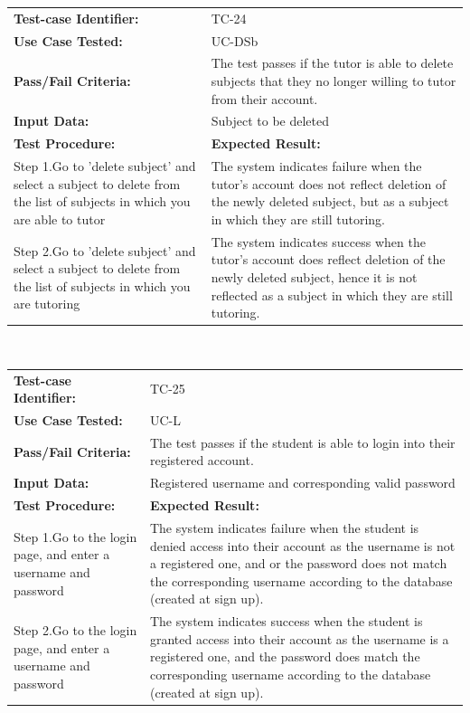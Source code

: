 \documentclass[12pt]{article}
\begin{document}
{\begin{tabular}{| p{8cm} | p{8cm} |} \hline
	\textbf{Test-case Identifier:}& TC-24\\
	\textbf{Use Case Tested:}& UC-DSb\\
	\textbf{Pass/Fail Criteria:}& The test passes if the tutor is able to delete subjects that they no longer willing to tutor from  their account.\\
	\textbf{Input Data:}& Subject to be deleted\\\hline
	\textbf{Test Procedure:}& \textbf{Expected Result:} \\\hline
	Step 1.Go to 'delete subject' and select a subject to delete from the list of subjects in which you are able to tutor & The system indicates failure when the tutor's account does not reflect deletion of the newly deleted subject, but as a subject in which they are still tutoring. \\
	Step 2.Go to 'delete subject' and select a subject to delete from the list of subjects in which you are tutoring & The system indicates success when the tutor's account does  reflect deletion of the newly deleted subject, hence it is not reflected  as a subject in which they are still tutoring.\\
		\hline
\end{tabular}
\\

\begin{tabular}{| p{8cm} | p{8cm} |} \hline
	\textbf{Test-case Identifier:}& TC-25\\
	\textbf{Use Case Tested:}& UC-L\\
	\textbf{Pass/Fail Criteria:}& The test passes if the student is able to login into their registered account.\\
	\textbf{Input Data:}& Registered username and corresponding valid password\\\hline
	\textbf{Test Procedure:}& \textbf{Expected Result:} \\\hline
	Step 1.Go to the login page, and enter a username and password & The system indicates failure when the student is denied access into their account as the username is not a registered one, and or the password does not match the corresponding username according to the database (created at sign up). \\
	Step 2.Go to the login page, and enter a username and password & The system indicates success when the student is granted access into their account as the username is  a registered one, and  the password does  match the corresponding username according to the database (created at sign up).\\
		\hline
\end{tabular}
\\

}
\end{document}
